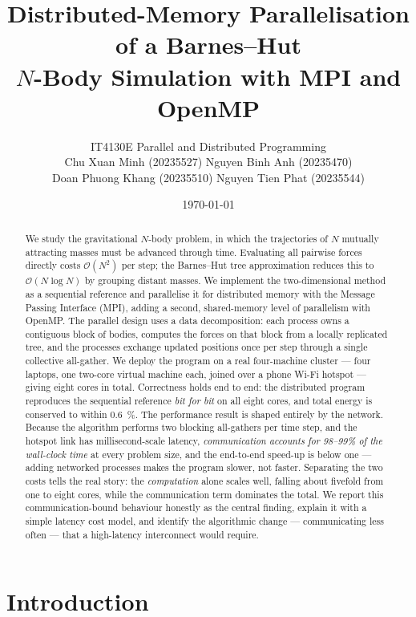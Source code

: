 \documentclass[11pt,a4paper]{article}
\title{\textbf{Distributed-Memory Parallelisation of a Barnes--Hut\\
$N$-Body Simulation with MPI and OpenMP}}
\author{%
  IT4130E Parallel and Distributed Programming\\[2pt]
  \small Chu Xuan Minh (20235527) \quad Nguyen Binh Anh (20235470)\\[2pt]
  \small Doan Phuong Khang (20235510) \quad Nguyen Tien Phat (20235544)
}
\date{\today}
\begin{document}
\maketitle

\begin{abstract}
We study the gravitational $N$-body problem, in which the trajectories of $N$
mutually attracting masses must be advanced through time. Evaluating all pairwise
forces directly costs $\mathcal{O}(N^2)$ per step; the Barnes--Hut tree
approximation reduces this to $\mathcal{O}(N\log N)$ by grouping distant masses.
We implement the two-dimensional method as a sequential reference and parallelise
it for distributed memory with the Message Passing Interface (MPI), adding a
second, shared-memory level of parallelism with OpenMP. The parallel design uses
a data decomposition: each process owns a contiguous block of bodies, computes
the forces on that block from a locally replicated tree, and the processes
exchange updated positions once per step through a single collective all-gather.
We deploy the program on a real four-machine cluster --- four laptops, one
two-core virtual machine each, joined over a phone Wi-Fi hotspot --- giving eight
cores in total. Correctness holds end to end: the distributed program reproduces
the sequential reference \emph{bit for bit} on all eight cores, and total energy is
conserved to within \SI{0.6}{\percent}. The performance result is shaped entirely
by the network. Because the algorithm performs two blocking all-gathers per time
step, and the hotspot link has millisecond-scale latency, \emph{communication
accounts for 98--99\% of the wall-clock time} at every problem size, and the
end-to-end speed-up is below one --- adding networked processes makes the program
slower, not faster. Separating the two costs tells the real story: the
\emph{computation} alone scales well, falling about fivefold from one to eight
cores, while the communication term dominates the total. We report this
communication-bound behaviour honestly as the central finding, explain it with a
simple latency cost model, and identify the algorithmic change --- communicating
less often --- that a high-latency interconnect would require.
\end{abstract}

\tableofcontents

\section{Introduction}
\label{sec:intro}
\end{document}
